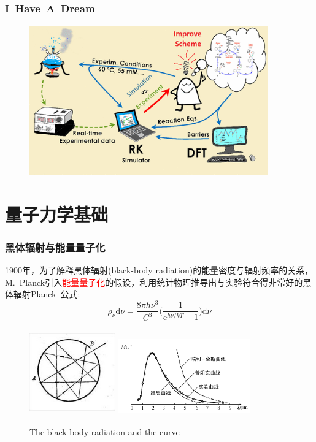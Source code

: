 \frame
{
	\frametitle{\rm{I~Have~A~Dream}}
\begin{figure}[h!]
\vspace*{-0.18in}
\centering
\includegraphics[height=2.55in,width=4.05in]{Figures/Schematic_Material-Design.png}
\label{Schematic_Material-Design}
\end{figure}
}

\section{量子力学基础}
\frame
{
	\frametitle{黑体辐射与能量量子化}
	\textrm{1900}年，为了解释黑体辐射\textrm{(black-body radiation)}的能量密度与辐射频率的关系，\textrm{M.~Planck}引入\textcolor{red}{能量量子化}的假设，利用统计物理推导出与实验符合得非常好的黑体辐射\textrm{Planck~}公式:~
	\begin{displaymath}
		\rho_{\nu}\mathrm{d}{\nu}=\dfrac{8{\pi}h{\nu}^3}{C^3}\bigg(\dfrac1{\mathrm{e}^{h\nu/kT}-1}\bigg)\mathrm{d}\nu
	\end{displaymath}
\begin{figure}[h!]
\centering
\vspace{-10.5pt}
\includegraphics[height=1.45in,width=1.45in,viewport=0 0 136 136,clip]{Figures/Black_box.jpg}
\hskip 1pt
\includegraphics[height=1.32in,width=2.25in,viewport=0 0 390 215,clip]{Figures/Black_box_curve.png}
\caption{\textrm{The black-body radiation and the curve}}
\label{Black_box}
\end{figure}
}

